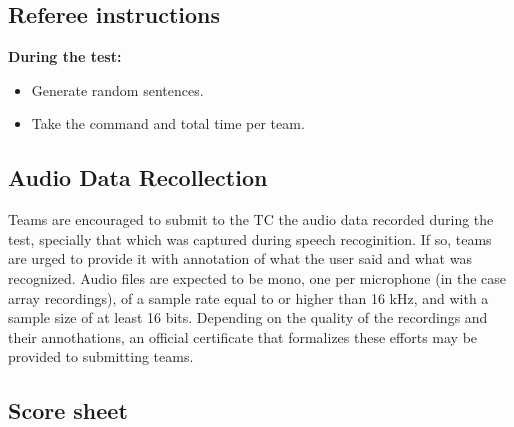 \subsection{Referee instructions}
\textbf{During the test:}
\begin{itemize}
	\item Generate random sentences. %
	\item Take the command and total time per team.
\end{itemize}

\subsection {Audio Data Recollection}
Teams are encouraged to submit to the TC the audio data recorded during the test, specially that which was captured during speech recoginition. If so, teams are urged to provide it with annotation of what the user said and what was recognized. Audio files are expected to be mono, one per microphone (in the case array recordings), of a sample rate equal to or higher than 16 kHz, and with a sample size of at least 16 bits. Depending on the quality of the recordings and their annothations, an official certificate that formalizes these efforts may be provided to submitting teams.

\newpage
\subsection{Score sheet}



